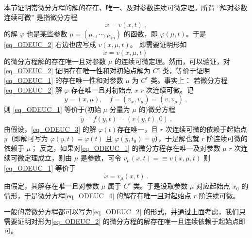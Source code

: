 
本节证明常微分方程的解的存在、唯一、及对参数连续可微定理。所谓 “解对参数连续可微” 是指微分方程
\begin{equation}\label{eq_ODEUC_2}
\dot x=v(x,t)~,
\end{equation}
 的解 $\varphi$ 也是某些参数 $\mu=(\mu_1,\cdots,\mu_m)$ 的函数，即 $\varphi(\mu,t)$。于是 \autoref{eq_ODEUC_2} 右边也应写成 $v(x,\mu,t)$。 即需要证明形如
\begin{equation}\label{eq_ODEUC_1}
\dot x=v(x,\mu,t)~
\end{equation}
的微分方程解的存在唯一且对参数 $\mu$ 的连续可微定理。然而，可以验证，对\autoref{eq_ODEUC_2} 证明存在唯一性和对初始点解为 $C^r$ 类，等价于证明\autoref{eq_ODEUC_1} 的存在唯一性和对参数 $\mu$ 为 $C^r$ 类。事实上：
若微分方程\autoref{eq_ODEUC_2} 解 $\varphi$ 存在唯一且对初始点 $x$ $r$ 次连续可微。记 
\begin{equation}
y=(x,\mu),\quad f=(v_x,v_{\mu})=(v,v_{\mu})~,
\end{equation}
则 \autoref{eq_ODEUC_1} 等价于(初始 $\mu$ 分量为 $\mu$ 的)微分方程
\begin{equation}\label{eq_ODEUC_3}
\begin{aligned}
\dot y=f(y,t)=(v(y,t),0)~.
\end{aligned}
\end{equation}
由假设，\autoref{eq_ODEUC_3} 的解 $\varphi(t)$存在唯一，且 $r$ 次连续可微的依赖于起始点 $y$（即解可写为 $\varphi(y,t)\equiv\varphi(t)$ 且 $\varphi(y,t_0)=y$），于是解也就 $r$ 阶连续可微的依赖于 $\mu$；
反之，如果对\autoref{eq_ODEUC_1} 的微分方程存在唯一及对参数 $\mu$ $r$ 次连续可微定理成立，则由 $\mu$ 是参数，可令 $v_\mu(x,t)=\equiv v(x,\mu,t)$ 则\autoref{eq_ODEUC_1} 等价于
\begin{equation}\label{eq_ODEUC_4} 
\dot x=v_{\mu}(x,t)~.
\end{equation}
由假定，其解存在唯一且对参数 $\mu$ 属于 $C^r$ 类。于是设取参数 $\mu$ 对应起始点 $x_0$ 的情形，于是微分方程\autoref{eq_ODEUC_4} 的解存在唯一且对起始点 $r$ 阶连续可微。

一般的常微分方程都可以写为\autoref{eq_ODEUC_2} 的形式，并通过上面考虑，我们只需要证明对形为\autoref{eq_ODEUC_2} 的微分方程的解存在唯一且连续依赖于起始点即可。

